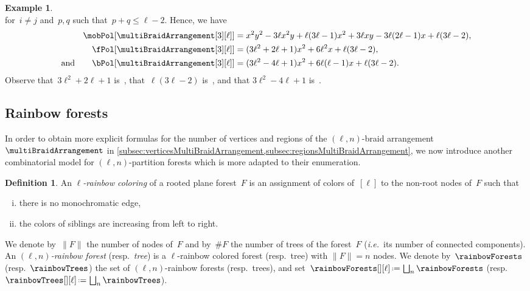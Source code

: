\documentclass{amsart}
\newcommand{\darkblue}{\color{darkblue}} %
\newcommand{\vincenti}[1]{\todo[color=blue!30, inline]{\rm #1 \\ \hfill --- V.}}
\theoremstyle{definition}
\newtheorem{definition}[theorem]{Definition}
\newtheorem{example}[theorem]{Example}
\newcommand{\eqdef}{\mbox{\,\raisebox{0.2ex}{\scriptsize\ensuremath{\mathrm:}}\ensuremath{=}\,}} %
\newcommand{\card}[1]{\##1} %
\newcommand{\ie}{\textit{i.e.}~} %
\newcommand{\resp}{resp.~} %
\newcommand{\defn}[1]{\textsl{\darkblue #1}} %
\newcommand{\OEIS}[1]{\cite[{\rm \href{http://oeis.org/#1}{\texttt{#1}}}]{OEIS}}
\begin{document}
\begin{example}
\[\]
for~$i \ne j$ and~$p, q$ such that~$p + q \le \ell-2$.
Hence, we have
\begin{align*}
\mobPol[{\multiBraidArrangement[3][\ell]}] & = x^2 y^2 - 3 \ell x^2 y + \ell (3 \ell - 1) x^2 + 3 \ell x y - 3 \ell (2 \ell - 1) x + \ell (3 \ell - 2) , \\
\fPol[{\multiBraidArrangement[3][\ell]}] & = (3 \ell^2 + 2 \ell + 1) x^2 + 6 \ell^2 x + \ell (3 \ell - 2), \\
\text{and}\qquad
\bPol[{\multiBraidArrangement[3][\ell]}] & = (3 \ell^2 - 4 \ell + 1) x^2 + 6 \ell (\ell - 1) x + \ell (3 \ell - 2).
\end{align*}
Observe that~$3 \ell^2 + 2 \ell + 1$ is~\OEIS{A056109}, that~$\ell (3 \ell - 2)$ is~\OEIS{A000567}, and that ${3 \ell^2 - 4 \ell + 1}$ is~\OEIS{A045944}.
\end{example}


\subsection{Rainbow forests}
\label{subsec:rainbowForests}

In order to obtain more explicit formulas for the number of vertices and regions of the $(\ell,n)$-braid arrangement~$\multiBraidArrangement$ in \cref{subsec:verticesMultiBraidArrangement,subsec:regionsMultiBraidArrangement}, we now introduce another combinatorial model for $(\ell,n)$-partition forests which is more adapted to their enumeration.

\begin{definition}
\label{def:rainbowForest}
An \defn{$\ell$-rainbow coloring} of a rooted plane forest~$F$ is an assignment of colors of~$[\ell]$ to the non-root nodes of~$F$ such that
\begin{enumerate}[(i)]
\item there is no monochromatic edge,
\item the colors of siblings are increasing from left to right.
\end{enumerate}
We denote by~$\|F\|$ the number of nodes of~$F$ and by~$\card{F}$ the number of trees of the forest~$F$ (\ie its number of connected components).
An \defn{$(\ell,n)$-rainbow forest} (\resp \defn{tree}) is a \mbox{$\ell$-rainbow} colored forest (\resp tree) with $\|F\| = n$ nodes.
We denote by~$\rainbowForests$ (\resp $\rainbowTrees$) the set of $(\ell,n)$-rainbow forests (\resp trees), and set~$\rainbowForests[][\ell] \eqdef \bigsqcup_n \rainbowForests$ (\resp $\rainbowTrees[][\ell] \eqdef \bigsqcup_n \rainbowTrees$).
\end{definition}
\end{document}
